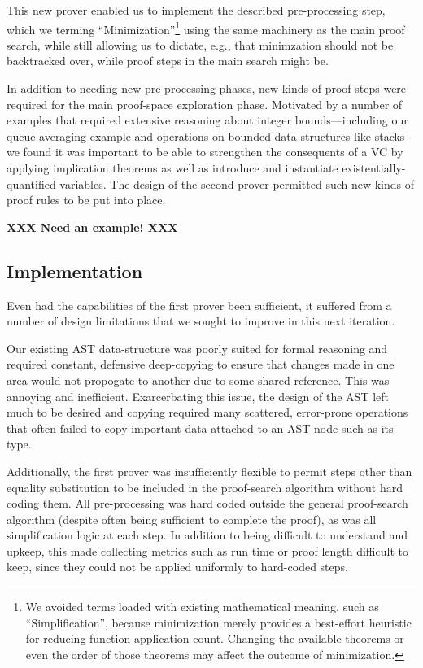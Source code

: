 This new prover enabled us to implement the described pre-processing step, which we terming ``Minimization''\footnote{We avoided terms loaded with existing mathematical meaning, such as ``Simplification'', because minimization merely provides a best-effort heuristic for reducing function application count.  Changing the available theorems or even the order of those theorems may affect the outcome of minimization.} using the same machinery as the main proof search, while still allowing us to dictate, e.g., that minimzation should not be backtracked over, while proof steps in the main search might be.

In addition to needing new pre-processing phases, new kinds of proof steps were required for the main proof-space exploration phase.  Motivated by a number of examples that required extensive reasoning about integer bounds---including our queue averaging example and operations on bounded data structures like stacks--we found it was important to be able to strengthen the consequents of a VC by applying implication theorems as well as introduce and instantiate existentially-quantified variables.  The design of the second prover permitted such new kinds of proof rules to be put into place.

\textbf{XXX Need an example! XXX}

	\subsection{Implementation}

Even had the capabilities of the first prover been sufficient, it suffered from a number of design limitations that we sought to improve in this next iteration.

Our existing AST data-structure was poorly suited for formal reasoning and required constant, defensive deep-copying to ensure that changes made in one area would not propogate to another due to some shared reference.  This was annoying and inefficient.  Exarcerbating this issue, the design of the AST left much to be desired and copying required many scattered, error-prone operations that often failed to copy important data attached to an AST node such as its type.

Additionally, the first prover was insufficiently flexible to permit steps other than equality substitution to be included in the proof-search algorithm without hard coding them.  All pre-processing was hard coded outside the general proof-search algorithm (despite often being sufficient to complete the proof), as was all simplification logic at each step.  In addition to being difficult to understand and upkeep, this made collecting metrics such as run time or proof length difficult to keep, since they could not be applied uniformly to hard-coded steps.

